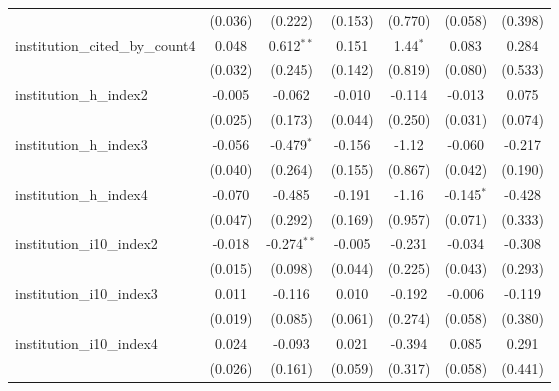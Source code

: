 \begin{tabular}{lcccccc}
                                         & (0.036)        & (0.222)       & (0.153)       & (0.770)      & (0.058)      & (0.398)\\   
   institution\_cited\_by\_count4        & 0.048          & 0.612$^{**}$  & 0.151         & 1.44$^{*}$   & 0.083        & 0.284\\   
                                         & (0.032)        & (0.245)       & (0.142)       & (0.819)      & (0.080)      & (0.533)\\   
   institution\_h\_index2                & -0.005         & -0.062        & -0.010        & -0.114       & -0.013       & 0.075\\   
                                         & (0.025)        & (0.173)       & (0.044)       & (0.250)      & (0.031)      & (0.074)\\   
   institution\_h\_index3                & -0.056         & -0.479$^{*}$  & -0.156        & -1.12        & -0.060       & -0.217\\   
                                         & (0.040)        & (0.264)       & (0.155)       & (0.867)      & (0.042)      & (0.190)\\   
   institution\_h\_index4                & -0.070         & -0.485        & -0.191        & -1.16        & -0.145$^{*}$ & -0.428\\   
                                         & (0.047)        & (0.292)       & (0.169)       & (0.957)      & (0.071)      & (0.333)\\   
   institution\_i10\_index2              & -0.018         & -0.274$^{**}$ & -0.005        & -0.231       & -0.034       & -0.308\\   
                                         & (0.015)        & (0.098)       & (0.044)       & (0.225)      & (0.043)      & (0.293)\\   
   institution\_i10\_index3              & 0.011          & -0.116        & 0.010         & -0.192       & -0.006       & -0.119\\   
                                         & (0.019)        & (0.085)       & (0.061)       & (0.274)      & (0.058)      & (0.380)\\   
   institution\_i10\_index4              & 0.024          & -0.093        & 0.021         & -0.394       & 0.085        & 0.291\\   
                                         & (0.026)        & (0.161)       & (0.059)       & (0.317)      & (0.058)      & (0.441)\\   

\end{tabular}

